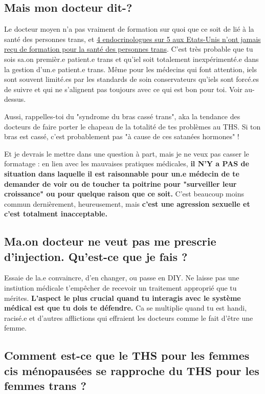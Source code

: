 \documentclass{article}
\begin{document}
\subsection{Mais mon docteur dit-?}

Le docteur moyen n'a pas vraiment de formation sur quoi que ce soit de lié à la santé des personnes trans, et \href{https://www.endocrine.org/news-and-advocacy/news-room/2017/endocrinologists-want-training-in-transgender-care }{4 endocrinologues sur 5 aux Etats-Unis n'ont jamais reçu de formation pour la santé des personnes trans}. C'est très probable que tu sois sa.on premièr.e patient.e trans et qu'iel soit totalement inexpérimenté.e dans la gestion d'un.e patient.e trans. Même pour les médecins qui font attention, iels sont souvent limité.es par les standards de soin conservateurs qu'iels sont forcé.es de suivre et qui ne s'alignent pas toujours avec ce qui est bon pour toi. Voir au-dessus.

Aussi, rappelles-toi du "syndrome du bras cassé trans", aka la tendance des docteurs de faire porter le chapeau de la totalité de tes problèmes au THS. Si ton bras est cassé, c'est probablement pas "à cause de ces satanées hormones" !

Et je devrais le mettre dans une question à part, mais je ne veux pas casser le formatage : en lien avec les mauvaises pratiques médicales, \textbf{il N'Y a PAS de situation dans laquelle il est raisonnable pour un.e médecin de te demander de voir ou de toucher ta poitrine pour "surveiller leur croissance" ou pour quelque raison que ce soit.} C'est beaucoup moins commun dernièrement, heureusement, mais \textbf{c'est une agression sexuelle et c'est totalment inacceptable.}

\subsection{Ma.on docteur ne veut pas me prescrie d'injection. Qu'est-ce que je fais ?}

Essaie de la.e convaincre, d'en changer, ou passe en DIY. Ne laisse pas une instiution médicale t'empêcher de recevoir un traitement approprié que tu mérites. \textbf{L'aspect le plus crucial quand tu interagis avec le système médical est que tu dois te défendre.} Ca se multiplie quand tu est handi, racisé.e et d'autres afflictions qui effraient les docteurs comme le fait d'être une femme.

\subsection{Comment est-ce que le THS pour les femmes cis ménopausées se rapproche du THS pour les femmes trans ?}\label{11-29}
\end{document}
